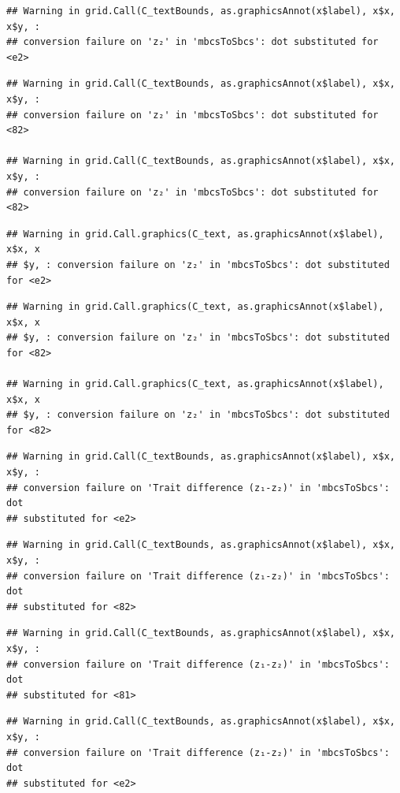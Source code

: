 \documentclass[]{article}
\begin{document}
\begin{verbatim}
## Warning in grid.Call(C_textBounds, as.graphicsAnnot(x$label), x$x, x$y, :
## conversion failure on 'z₂' in 'mbcsToSbcs': dot substituted for <e2>
\end{verbatim}

\begin{verbatim}
## Warning in grid.Call(C_textBounds, as.graphicsAnnot(x$label), x$x, x$y, :
## conversion failure on 'z₂' in 'mbcsToSbcs': dot substituted for <82>

## Warning in grid.Call(C_textBounds, as.graphicsAnnot(x$label), x$x, x$y, :
## conversion failure on 'z₂' in 'mbcsToSbcs': dot substituted for <82>
\end{verbatim}

\begin{verbatim}
## Warning in grid.Call.graphics(C_text, as.graphicsAnnot(x$label), x$x, x
## $y, : conversion failure on 'z₂' in 'mbcsToSbcs': dot substituted for <e2>
\end{verbatim}

\begin{verbatim}
## Warning in grid.Call.graphics(C_text, as.graphicsAnnot(x$label), x$x, x
## $y, : conversion failure on 'z₂' in 'mbcsToSbcs': dot substituted for <82>

## Warning in grid.Call.graphics(C_text, as.graphicsAnnot(x$label), x$x, x
## $y, : conversion failure on 'z₂' in 'mbcsToSbcs': dot substituted for <82>
\end{verbatim}

\begin{verbatim}
## Warning in grid.Call(C_textBounds, as.graphicsAnnot(x$label), x$x, x$y, :
## conversion failure on 'Trait difference (z₁-z₂)' in 'mbcsToSbcs': dot
## substituted for <e2>
\end{verbatim}

\begin{verbatim}
## Warning in grid.Call(C_textBounds, as.graphicsAnnot(x$label), x$x, x$y, :
## conversion failure on 'Trait difference (z₁-z₂)' in 'mbcsToSbcs': dot
## substituted for <82>
\end{verbatim}

\begin{verbatim}
## Warning in grid.Call(C_textBounds, as.graphicsAnnot(x$label), x$x, x$y, :
## conversion failure on 'Trait difference (z₁-z₂)' in 'mbcsToSbcs': dot
## substituted for <81>
\end{verbatim}

\begin{verbatim}
## Warning in grid.Call(C_textBounds, as.graphicsAnnot(x$label), x$x, x$y, :
## conversion failure on 'Trait difference (z₁-z₂)' in 'mbcsToSbcs': dot
## substituted for <e2>
\end{verbatim}
\end{document}
